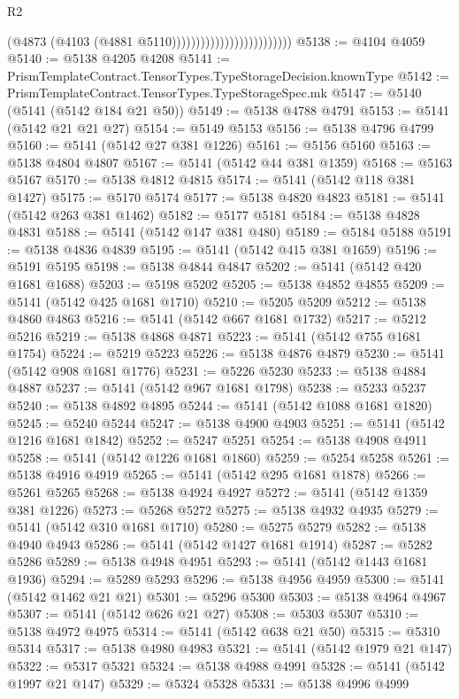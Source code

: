 \begin{lexlean}{R2}
\begin{coremodule}
                                                (@4873 (@4103 (@4881 @5110)))))))))))))))))))))))))
@5138 := @4104 @4059
@5140 := @5138 @4205 @4208
@5141 := PrismTemplateContract.TensorTypes.TypeStorageDecision.knownType
@5142 := PrismTemplateContract.TensorTypes.TypeStorageSpec.mk
@5147 := @5140 (@5141 (@5142 @184 @21 @50))
@5149 := @5138 @4788 @4791
@5153 := @5141 (@5142 @21 @21 @27)
@5154 := @5149 @5153
@5156 := @5138 @4796 @4799
@5160 := @5141 (@5142 @27 @381 @1226)
@5161 := @5156 @5160
@5163 := @5138 @4804 @4807
@5167 := @5141 (@5142 @44 @381 @1359)
@5168 := @5163 @5167
@5170 := @5138 @4812 @4815
@5174 := @5141 (@5142 @118 @381 @1427)
@5175 := @5170 @5174
@5177 := @5138 @4820 @4823
@5181 := @5141 (@5142 @263 @381 @1462)
@5182 := @5177 @5181
@5184 := @5138 @4828 @4831
@5188 := @5141 (@5142 @147 @381 @480)
@5189 := @5184 @5188
@5191 := @5138 @4836 @4839
@5195 := @5141 (@5142 @415 @381 @1659)
@5196 := @5191 @5195
@5198 := @5138 @4844 @4847
@5202 := @5141 (@5142 @420 @1681 @1688)
@5203 := @5198 @5202
@5205 := @5138 @4852 @4855
@5209 := @5141 (@5142 @425 @1681 @1710)
@5210 := @5205 @5209
@5212 := @5138 @4860 @4863
@5216 := @5141 (@5142 @667 @1681 @1732)
@5217 := @5212 @5216
@5219 := @5138 @4868 @4871
@5223 := @5141 (@5142 @755 @1681 @1754)
@5224 := @5219 @5223
@5226 := @5138 @4876 @4879
@5230 := @5141 (@5142 @908 @1681 @1776)
@5231 := @5226 @5230
@5233 := @5138 @4884 @4887
@5237 := @5141 (@5142 @967 @1681 @1798)
@5238 := @5233 @5237
@5240 := @5138 @4892 @4895
@5244 := @5141 (@5142 @1088 @1681 @1820)
@5245 := @5240 @5244
@5247 := @5138 @4900 @4903
@5251 := @5141 (@5142 @1216 @1681 @1842)
@5252 := @5247 @5251
@5254 := @5138 @4908 @4911
@5258 := @5141 (@5142 @1226 @1681 @1860)
@5259 := @5254 @5258
@5261 := @5138 @4916 @4919
@5265 := @5141 (@5142 @295 @1681 @1878)
@5266 := @5261 @5265
@5268 := @5138 @4924 @4927
@5272 := @5141 (@5142 @1359 @381 @1226)
@5273 := @5268 @5272
@5275 := @5138 @4932 @4935
@5279 := @5141 (@5142 @310 @1681 @1710)
@5280 := @5275 @5279
@5282 := @5138 @4940 @4943
@5286 := @5141 (@5142 @1427 @1681 @1914)
@5287 := @5282 @5286
@5289 := @5138 @4948 @4951
@5293 := @5141 (@5142 @1443 @1681 @1936)
@5294 := @5289 @5293
@5296 := @5138 @4956 @4959
@5300 := @5141 (@5142 @1462 @21 @21)
@5301 := @5296 @5300
@5303 := @5138 @4964 @4967
@5307 := @5141 (@5142 @626 @21 @27)
@5308 := @5303 @5307
@5310 := @5138 @4972 @4975
@5314 := @5141 (@5142 @638 @21 @50)
@5315 := @5310 @5314
@5317 := @5138 @4980 @4983
@5321 := @5141 (@5142 @1979 @21 @147)
@5322 := @5317 @5321
@5324 := @5138 @4988 @4991
@5328 := @5141 (@5142 @1997 @21 @147)
@5329 := @5324 @5328
@5331 := @5138 @4996 @4999

\end{coremodule}
\end{lexlean}
